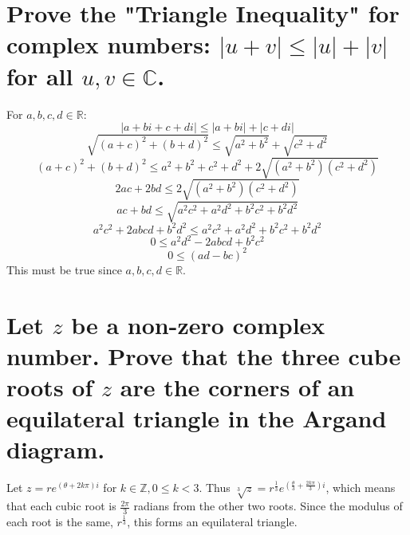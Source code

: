 \documentclass[12pt]{article}
\begin{document}
\section{
    Prove the "Triangle Inequality" for complex numbers: $|u+v| \leq |u| + |v|$ for all $u,v \in \mathds{C}$.
}
For $a,b,c,d \in \mathds{R}$:
$$|a+bi + c+di| \leq |a+bi| + |c+di|$$
$$\sqrt{(a+c)^2 + (b+d)^2} \leq \sqrt{a^2 + b^2} + \sqrt{c^2 +  d^2}$$
$$(a+c)^2 + (b+d)^2 \leq a^2 + b^2 + c^2 + d^2 + 2\sqrt{(a^2 + b^2)(c^2 +  d^2)}$$
$$2ac + 2bd \leq 2\sqrt{(a^2 + b^2)(c^2 +  d^2)}$$
$$ac + bd \leq \sqrt{a^2c^2 + a^2d^2 + b^2c^2 + b^2d^2}$$
$$a^2c^2 + 2abcd + b^2d^2 \leq a^2c^2 + a^2d^2 + b^2c^2 + b^2d^2$$
$$0 \leq a^2d^2 - 2abcd + b^2c^2$$
$$0 \leq (ad - bc)^2$$
This must be true since $a,b,c,d \in \mathds{R}$.

\section{
    Let $z$ be a non-zero complex number. Prove that the three cube roots of $z$ are the corners of an equilateral triangle in the Argand diagram.
}
Let $z = re^{(\theta + 2k \pi) i}$ for $k \in \mathds{Z}, 0 \leq k < 3$.
Thus $\sqrt[3]{z} = r^{\frac{1}{3}}e^{(\frac{\theta}{3} + \frac{2k \pi}{3}) i}$,
which means that each cubic root is $\frac{2 \pi}{3}$ radians from the other two roots.
Since the modulus of each root is the same, $r^{\frac{1}{3}}$, this forms an equilateral triangle.
\end{document}
